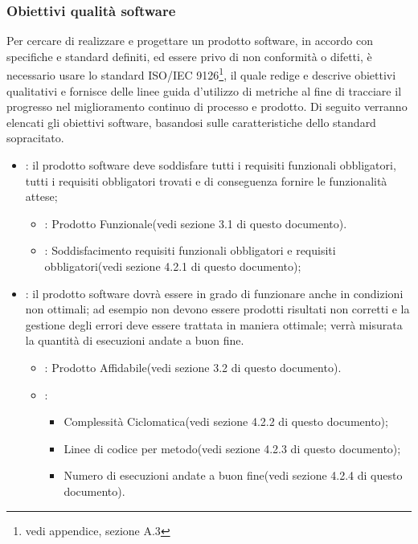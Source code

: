 \subsubsection{Obiettivi qualità software}
Per cercare di realizzare e progettare un prodotto software, in accordo con specifiche e standard definiti, ed essere privo di non conformità o difetti, è necessario usare lo standard ISO/IEC 9126\footnote{vedi appendice, sezione A.3}, il quale redige e descrive obiettivi qualitativi e fornisce delle linee guida d'utilizzo di metriche al fine di tracciare il progresso nel miglioramento continuo di processo e prodotto. 
Di seguito verranno elencati gli obiettivi software, basandosi sulle caratteristiche dello standard sopracitato. 
\begin{itemize}
\item {}: il prodotto software deve soddisfare tutti i requisiti funzionali obbligatori, tutti i requisiti obbligatori trovati e di conseguenza fornire le funzionalità attese;
\begin{itemize}
\item {}: Prodotto Funzionale(vedi sezione 3.1 di questo documento).
\item {}: Soddisfacimento requisiti funzionali obbligatori e requisiti obbligatori(vedi sezione 4.2.1 di questo documento);
\end{itemize}
\item {}: il prodotto software dovrà essere in grado di funzionare anche in condizioni non ottimali; ad esempio non devono essere prodotti risultati non corretti e la gestione degli errori deve essere trattata in maniera ottimale; verrà misurata la quantità di esecuzioni andate a buon fine.
\begin{itemize}
\item {}: Prodotto Affidabile(vedi sezione 3.2 di questo documento).
\item {}:
\begin{itemize}
\item Complessità Ciclomatica(vedi sezione 4.2.2 di questo documento);
\item Linee di codice per metodo(vedi sezione 4.2.3 di questo documento);
\item Numero di esecuzioni andate a buon fine(vedi sezione 4.2.4 di questo documento).
\end{itemize}
\end{itemize}

\end{itemize}
